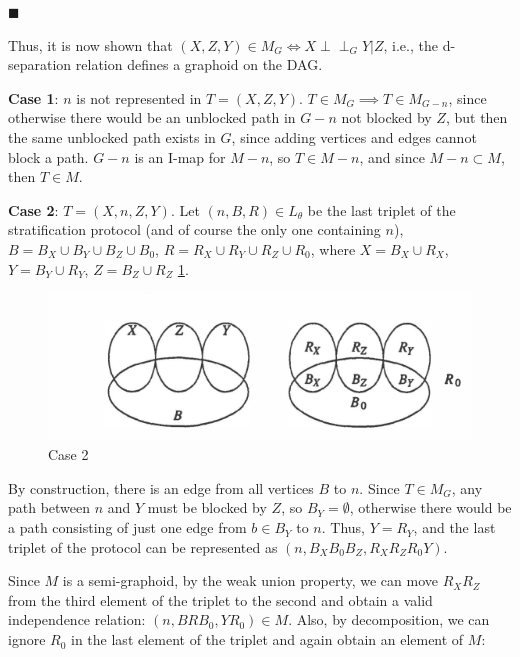 \documentclass[fleqn]{article}
\newcommand{\indepg}{\perp \!\!\! \perp_G}
\numberwithin{equation}{section}
\numberwithin{theorem}{section}
\numberwithin{figure}{section}
\numberwithin{lemma}{section}
\numberwithin{corollary}{section}
\begin{document}
\(\blacksquare\)

Thus, it is now shown that \( (X, Z, Y) \in M_G \iff X \indepg Y | Z \), i.e., the d-separation relation defines a graphoid on the DAG.

\textbf{Case 1}: \( n \) is not represented in \( T = (X, Z, Y) \). \( T \in M_G \implies T \in M_{G-n} \), since otherwise there would be an unblocked path in \( G-n \) not blocked by \( Z \), but then the same unblocked path exists in \( G \), since adding vertices and edges cannot block a path. \( G-n \) is an I-map for \( M-n \), so \( T \in M-n \), and since \( M-n \subset M \), then \( T \in M \).

\textbf{Case 2}: \( T = (X, n, Z, Y) \). Let \( (n, B, R) \in L_\theta \) be the last triplet of the stratification protocol (and of course the only one containing \( n \)), \( B = B_X \cup B_Y \cup B_Z \cup B_0 \), \( R = R_X \cup R_Y \cup R_Z \cup R_0 \), where \( X = B_X \cup R_X \), \( Y = B_Y \cup R_Y \), \( Z = B_Z \cup R_Z \) \ref{fig:case2}.

\begin{figure}[h]
	\begin{center}
		\includegraphics[scale=0.6]{imgs/img7.png}
	\end{center}
	\caption{Case 2}
	\label{fig:case2}
\end{figure}

By construction, there is an edge from all vertices \( B \) to \( n \). Since \( T \in M_G \), any path between \( n \) and \( Y \) must be blocked by \( Z \), so \( B_Y = \emptyset \), otherwise there would be a path consisting of just one edge from \( b \in B_Y \) to \( n \). Thus, \( Y = R_Y \), and the last triplet of the protocol can be represented as \( (n, B_X B_0 B_Z, R_X R_Z R_0 Y) \).

Since \( M \) is a semi-graphoid, by the weak union property, we can move \( R_X R_Z \) from the third element of the triplet to the second and obtain a valid independence relation: \( (n, B R B_0, Y R_0) \in M \). Also, by decomposition, we can ignore \( R_0 \) in the last element of the triplet and again obtain an element of \( M \):
\end{document}
